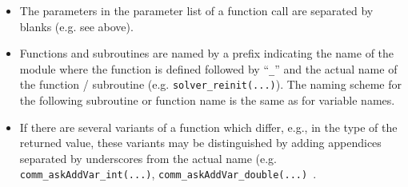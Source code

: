 \begin{itemize}
\item The parameters in the parameter list of a function call are separated by blanks (e.g. 
see above).

\item Functions and subroutines are named by a prefix indicating the name of the module where
the function is defined followed by ``{\tt \_}'' and the actual name of the function / 
subroutine (e.g. {\tt solver\_reinit(...)}). The naming scheme for the following subroutine or
function name is the same as for variable names.

\item If there are several variants of a function which differ, e.g., in the type of the 
returned value, these variants may be distinguished by adding appendices separated by 
underscores from the actual name (e.g. {\tt comm\_askAddVar\_int(...)}, 
{\tt comm\_askAddVar\_double(...) }.
\end{itemize} 
